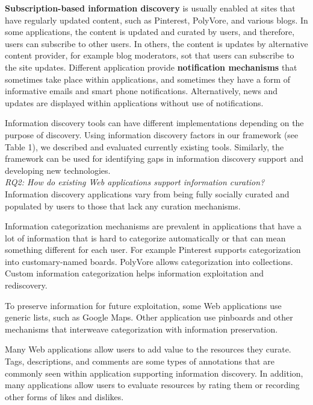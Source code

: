 \documentclass{casconpaper}
\begin{document}
{\textbf{Subscription-based information discovery} is usually enabled at sites that have regularly updated content, such as Pinterest, PolyVore, and various blogs. In some applications, the content is updated and curated by users, and therefore, users can subscribe to other users. In others, the content is updates by alternative content provider, for example blog moderators, sot that users can subscribe to the site updates. Different application provide \textbf{notification mechanisms} that sometimes take place within applications, and sometimes they have a form of informative emails and smart phone notifications. Alternatively, news and updates are displayed within applications without use of notifications.

Information discovery tools can have different implementations depending on the purpose of discovery. Using information discovery factors in our framework (see Table 1), we described and evaluated currently existing tools. Similarly, the framework can be used for identifying gaps in information discovery support and developing new technologies.   \\

\emph{RQ2: How do existing Web applications support information curation?}\\

Information discovery applications vary from being fully socially curated and populated by users to those that lack any curation mechanisms. 

Information categorization mechanisms are prevalent in applications that have a lot of information that is hard to categorize automatically or that can mean something different for each user. For example Pinterest supports categorization into customary-named boards. PolyVore allows categorization into collections. Custom information categorization helps information exploitation and rediscovery. 

To preserve information for future exploitation, some Web applications use generic lists, such as Google Maps. Other application use pinboards and other mechanisms that interweave categorization with information preservation.  

Many Web applications allow users to add value to the resources they curate. Tags, descriptions, and comments are some types of annotations that are commonly seen within application supporting information discovery. In addition, many applications allow users to evaluate resources by rating them or recording other forms of likes and dislikes.

}
\end{document}
